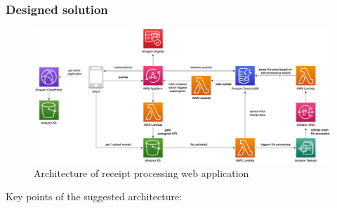 \subsubsection{Designed solution}

\begin{figure}[H]
    \centering
    \includegraphics[width=1\textwidth]{assets/04-serverless-for-web-apps/paragoneArchitecture.png}
    \caption{Architecture of receipt processing web application}
    \label{fig:paragone-web-app}
\end{figure}

Key points of the suggested architecture:

